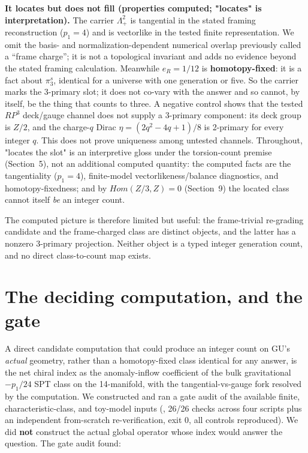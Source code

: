 \documentclass[11pt]{article}
\theoremstyle{remark}
\begin{document}
\textbf{It locates but does not fill (properties computed; "locates" is interpretation).} The carrier $\Lambda^2_+$ is tangential in the stated framing reconstruction ($p_1 = 4$) and is vectorlike in the tested finite representation. We omit the basis- and normalization-dependent numerical overlap previously called a ``frame charge''; it is not a topological invariant and adds no evidence beyond the stated framing calculation. Meanwhile $e_R = 1/12$ is \textbf{homotopy-fixed}: it is a fact about $\pi_3^s$, identical for a universe with one generation or five. So the carrier marks the 3-primary slot; it does not co-vary with the answer and so cannot, by itself, be the thing that counts to three. A negative control shows that the tested $RP^3$ deck/gauge channel does not supply a 3-primary component: its deck group is $Z/2$, and the charge-$q$ Dirac $\eta = (2q^2-4q+1)/8$ is 2-primary for every integer $q$. This does not prove uniqueness among untested channels. Throughout, "locates the slot" is an interpretive gloss under the torsion-count premise (Section~5), not an additional computed quantity: the computed facts are the tangentiality ($p_1 = 4$), finite-model vectorlikeness/balance diagnostics, and homotopy-fixedness; and by $Hom(Z/3, Z) = 0$ (Section~9) the located class cannot itself \emph{be} an integer count.

The computed picture is therefore limited but useful: the frame-trivial re-grading candidate and the frame-charged class are distinct objects, and the latter has a nonzero 3-primary projection. Neither object is a typed integer generation count, and no direct class-to-count map exists.

\section{The deciding computation, and the gate}
A direct candidate computation that could produce an integer count on GU's \emph{actual} geometry, rather than a homotopy-fixed class identical for any answer, is the net chiral index as the anomaly-inflow coefficient of the bulk gravitational $-p_1/24$ SPT class on the 14-manifold, with the tangential-vs-gauge fork resolved by the computation. We constructed and ran a gate audit of the available finite, characteristic-class, and toy-model inputs (, 26/26 checks across four scripts plus an independent from-scratch re-verification, exit 0, all controls reproduced). We did \textbf{not} construct the actual global operator whose index would answer the question. The gate audit found:
\end{document}
